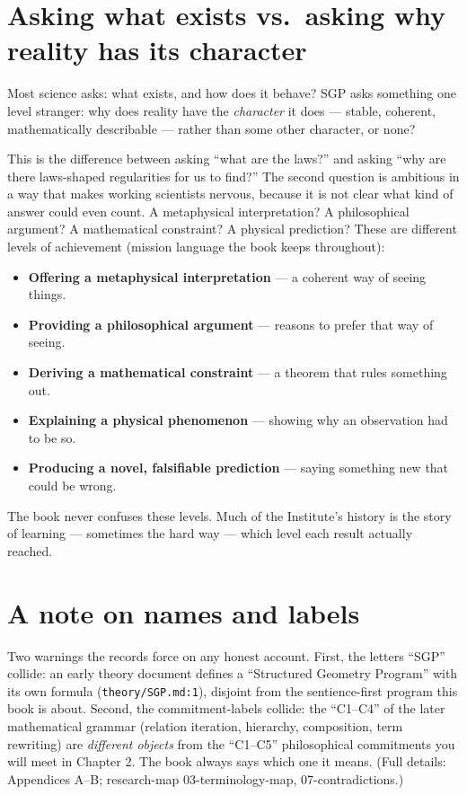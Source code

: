 \documentclass[
  11pt,
]{book}
\providecommand{\tightlist}{%
  \setlength{\itemsep}{0pt}\setlength{\parskip}{0pt}}
\begin{document}
\section{Asking what exists vs.~asking why reality has its
character}\label{asking-what-exists-vs.-asking-why-reality-has-its-character}

Most science asks: what exists, and how does it behave? SGP asks
something one level stranger: why does reality have the \emph{character}
it does --- stable, coherent, mathematically describable --- rather than
some other character, or none?

This is the difference between asking ``what are the laws?'' and asking
``why are there laws-shaped regularities for us to find?'' The second
question is ambitious in a way that makes working scientists nervous,
because it is not clear what kind of answer could even count. A
metaphysical interpretation? A philosophical argument? A mathematical
constraint? A physical prediction? These are different levels of
achievement (mission language the book keeps throughout):

\begin{itemize}
\tightlist
\item
  \textbf{Offering a metaphysical interpretation} --- a coherent way of
  seeing things.
\item
  \textbf{Providing a philosophical argument} --- reasons to prefer that
  way of seeing.
\item
  \textbf{Deriving a mathematical constraint} --- a theorem that rules
  something out.
\item
  \textbf{Explaining a physical phenomenon} --- showing why an
  observation had to be so.
\item
  \textbf{Producing a novel, falsifiable prediction} --- saying
  something new that could be wrong.
\end{itemize}

The book never confuses these levels. Much of the Institute's history is
the story of learning --- sometimes the hard way --- which level each
result actually reached.

\section{A note on names and labels}\label{a-note-on-names-and-labels}

Two warnings the records force on any honest account. First, the letters
``SGP'' collide: an early theory document defines a ``Structured
Geometry Program'' with its own formula (\texttt{theory/SGP.md:1}),
disjoint from the sentience-first program this book is about. Second,
the commitment-labels collide: the ``C1--C4'' of the later mathematical
grammar (relation iteration, hierarchy, composition, term rewriting) are
\emph{different objects} from the ``C1--C5'' philosophical commitments
you will meet in Chapter 2. The book always says which one it means.
(Full details: Appendices A--B; research-map 03-terminology-map,
07-contradictions.)
\end{document}

